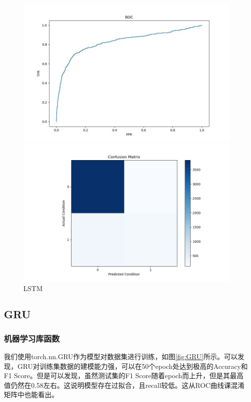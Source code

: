 \documentclass[UTF8]{article}
\begin{document}
\begin{figure}[h]
    \begin{minipage}{.48\linewidth}
        \centering
        \includegraphics[width=\linewidth]{../figure/LSTM_ROC.jpg}
    \end{minipage}
    \begin{minipage}{.48    \linewidth}
        \centering
        \includegraphics[width=\linewidth]{../figure/LSTM_Confusion.jpg}
    \end{minipage}
    \caption{LSTM}
    \label{fig:LSTM}
\end{figure}

\subsection{GRU}
\subsubsection{机器学习库函数}
我们使用torch.nn.GRU作为模型对数据集进行训练，如图\ref{fig:GRU}所示。可以发现，GRU对训练集数据的建模能力强，可以在50个epoch处达到极高的Accuracy和F1 Score。但是可以发现，虽然测试集的F1 Score随着epoch而上升，但是其最高值仍然在0.58左右。这说明模型存在过拟合，且recall较低。这从ROC曲线课混淆矩阵中也能看出。
\end{document}
